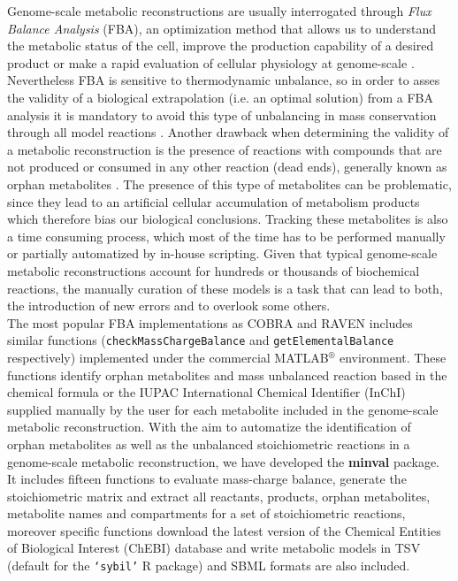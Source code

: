 Genome-scale metabolic reconstructions are usually interrogated through \emph{Flux Balance Analysis} (FBA), an optimization method that allows us to understand the metabolic status of the cell, improve the production capability of a desired product or make a rapid evaluation of cellular physiology at genome-scale \cite{Kim2008,Park2009}. Nevertheless FBA is sensitive to thermodynamic unbalance, so in order to asses the validity of a biological extrapolation (i.e. an optimal solution) from a FBA analysis it is mandatory to avoid this type of unbalancing in mass conservation through all model reactions \cite{Reznik2013}. Another drawback when determining  the validity of a metabolic reconstruction is the presence of  reactions with compounds that are not produced or consumed in any other reaction (dead ends), generally known as orphan metabolites  \cite{Park2009, Thiele2010}. The presence of this type of metabolites can be problematic, since they lead to an artificial cellular  accumulation of  metabolism products which therefore  bias our biological conclusions. Tracking these metabolites is also a time consuming process, which most of the time has to be performed manually or partially automatized by in-house scripting. Given that typical genome-scale metabolic reconstructions account for hundreds or thousands of biochemical reactions, the manually curation of these models is a task that can lead to both, the introduction of new errors and to overlook some others.\\

The most popular FBA implementations as COBRA and RAVEN includes similar functions (\texttt{checkMassChargeBalance} and \texttt{getElementalBalance} respectively) implemented under the commercial MATLAB$^{\circledR}$ environment. These functions identify orphan metabolites and mass unbalanced reaction based in the chemical formula or the IUPAC International Chemical Identifier (InChI) supplied manually by the user for each metabolite included in the genome-scale metabolic reconstruction. With the aim to automatize the identification of orphan metabolites as well as the unbalanced stoichiometric reactions in a genome-scale metabolic reconstruction, we have developed the \textbf{minval} package. It includes fifteen functions to evaluate mass-charge balance, generate the stoichiometric matrix and extract all reactants, products, orphan metabolites, metabolite names and compartments for a set of stoichiometric reactions, moreover specific functions download the latest version of the Chemical Entities of Biological Interest (ChEBI) database and write metabolic models in TSV  (default for the \texttt{`sybil'} R package) and SBML formats are also included.

